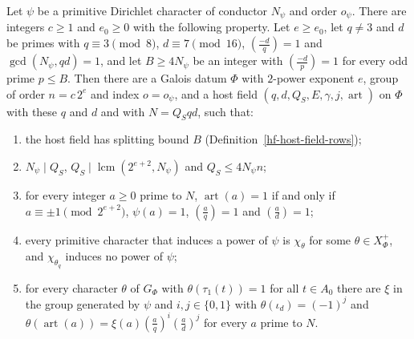 \begin{proposition}\label{hf-host-field-exists}
Let $\psi$ be a primitive Dirichlet character of conductor $N_\psi$ and order $o_\psi$. There are
integers $c\geq1$ and $e_0\geq0$ with the following property. Let $e\geq e_0$, let $q\neq3$ and $d$
be primes with $q\equiv3\pmod8$, $d\equiv7\pmod{16}$, $\left(\frac{-d}{q}\right)=1$ and
$\gcd(N_\psi,qd)=1$, and let $B\geq4N_\psi$ be an integer with $\left(\frac{-d}{p}\right)=1$ for
every odd prime $p\leq B$. Then there are a Galois datum $\Phi$ with $2$-power exponent $e$, group of order
$n=c\,2^e$ and index $o=o_\psi$, and a host field $(q,d,Q_S,E,\gamma,j,\operatorname{art})$ on
$\Phi$ with these $q$ and $d$ and with $N=Q_Sqd$, such that:
\begin{enumerate}
\item the host field has splitting bound $B$ (Definition~\ref{hf-host-field-rows});
\item $N_\psi\mid Q_S$, $Q_S\mid\operatorname{lcm}(2^{e+2},N_\psi)$ and $Q_S\leq4N_\psi n$;
\item for every integer $a\geq0$ prime to $N$, $\operatorname{art}(a)=1$ if and only if
  $a\equiv\pm1\pmod{2^{e+2}}$, $\psi(a)=1$, $\left(\frac aq\right)=1$ and
  $\left(\frac ad\right)=1$;
\item every primitive character that induces a power of $\psi$ is $\chi_\theta$ for some
  $\theta\in X^+_\Phi$, and $\chi_{\theta_q}$ induces no power of $\psi$;
\item for every character $\theta$ of $G_\Phi$ with $\theta(\tau_1(t))=1$ for all $t\in A_0$ there
  are $\xi$ in the group generated by $\psi$ and $i,j\in\{0,1\}$ with $\theta(\iota_d)=(-1)^j$ and
  $\theta(\operatorname{art}(a))=\xi(a)\left(\frac aq\right)^i\left(\frac ad\right)^j$ for every
  $a$ prime to $N$.
\end{enumerate}
\end{proposition}

